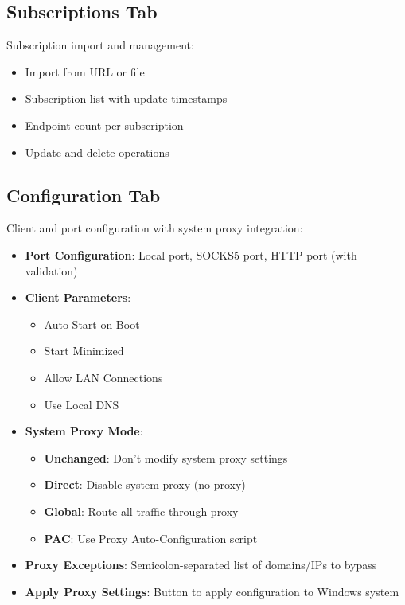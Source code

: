\subsection{Subscriptions Tab}

Subscription import and management:
\begin{itemize}
    \item Import from URL or file
    \item Subscription list with update timestamps
    \item Endpoint count per subscription
    \item Update and delete operations
\end{itemize}

\subsection{Configuration Tab}

Client and port configuration with system proxy integration:

\begin{itemize}
    \item \textbf{Port Configuration}: Local port, SOCKS5 port, HTTP port (with validation)
    \item \textbf{Client Parameters}:
    \begin{itemize}
        \item Auto Start on Boot
        \item Start Minimized
        \item Allow LAN Connections
        \item Use Local DNS
    \end{itemize}
    \item \textbf{System Proxy Mode}:
    \begin{itemize}
        \item \textbf{Unchanged}: Don't modify system proxy settings
        \item \textbf{Direct}: Disable system proxy (no proxy)
        \item \textbf{Global}: Route all traffic through proxy
        \item \textbf{PAC}: Use Proxy Auto-Configuration script
    \end{itemize}
    \item \textbf{Proxy Exceptions}: Semicolon-separated list of domains/IPs to bypass
    \item \textbf{Apply Proxy Settings}: Button to apply configuration to Windows system
\end{itemize}

